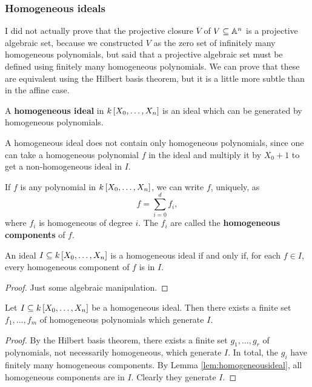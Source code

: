 \subsubsection{Homogeneous ideals}

I did not actually prove that the projective closure $ \overline{V} $ of $ V \subseteq \AA^n $ is a projective algebraic set, because we constructed $ V $ as the zero set of infinitely many homogeneous polynomials, but said that a projective algebraic set must be defined using finitely many homogeneous polynomials. We can prove that these are equivalent using the Hilbert basis theorem, but it is a little more subtle than in the affine case.

\begin{definition*}
A \textbf{homogeneous ideal} in $ k\sbr{X_0, \dots, X_n} $ is an ideal which can be generated by homogeneous polynomials.
\end{definition*}

\begin{note*}
A homogeneous ideal does not contain only homogeneous polynomials, since one can take a homogeneous polynomial $ f $ in the ideal and multiply it by $ X_0 + 1 $ to get a non-homogeneous ideal in $ I $.
\end{note*}

If $ f $ is any polynomial in $ k\sbr{X_0, \dots, X_n} $, we can write $ f $, uniquely, as
$$ f = \sum_{i = 0}^d f_i, $$
where $ f_i $ is homogeneous of degree $ i $. The $ f_i $ are called the \textbf{homogeneous components} of $ f $.

\begin{lemma}
\label{lem:homogeneousideal}
An ideal $ I \subseteq k\sbr{X_0, \dots, X_n} $ is a homogeneous ideal if and only if, for each $ f \in I $, every homogeneous component of $ f $ is in $ I $.
\end{lemma}

\begin{proof}
Just some algebraic manipulation.
\end{proof}

\begin{proposition}
\label{prop:homogeneousideal}
Let $ I \subseteq k\sbr{X_0, \dots, X_n} $ be a homogeneous ideal. Then there exists a finite set $ f_1, \dots, f_m $ of homogeneous polynomials which generate $ I $.
\end{proposition}

\begin{proof}
By the Hilbert basis theorem, there exists a finite set $ g_1, \dots, g_r $ of polynomials, not necessarily homogeneous, which generate $ I $. In total, the $ g_i $ have finitely many homogeneous components. By Lemma \ref{lem:homogeneousideal}, all homogeneous components are in $ I $. Clearly they generate $ I $.
\end{proof}

